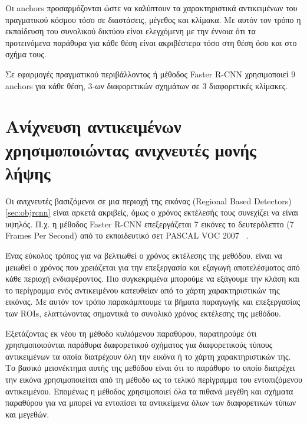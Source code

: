 Οι anchors προσαρμόζονται ώστε να καλύπτουν τα χαρακτηριστικά αντικειμένων του
πραγματικού κόσμου τόσο σε διαστάσεις, μέγεθος και κλίμακα. Με αυτόν τον τρόπο
η εκπαίδευση του συνολικού δικτύου είναι ελεγχόμενη με την έννοια ότι τα προτεινόμενα
παράθυρα για κάθε θέση είναι ακριβέστερα τόσο στη θέση όσο και στο σχήμα τους.

Σε εφαρμογές πραγματικού περιβάλλοντος ή μέθοδος Faster R-CNN χρησιμοποιεί 9
anchors για κάθε θέση, 3-ων διαφορετικών σχημάτων σε 3 διαφορετικές κλίμακες.

\section{Ανίχνευση αντικειμένων χρησιμοποιώντας ανιχνευτές μονής λήψης}\label{sec:objssd}

Οι ανιχνευτές βασιζόμενοι σε μια περιοχή της εικόνας (Regional Based Detectors)
\ref{sec:objrcnn} είναι αρκετά ακριβείς, όμως ο χρόνος εκτέλεσής τους συνεχίζει
να είναι υψηλός. Π.χ. η μέθοδος Faster R-CNN επεξεργάζεται 7 εικόνες το δευτερόλεπτο
(7 Frames Per Second) από το εκπαιδευτικό σετ PASCAL VOC 2007~\cite{pascal-voc-2007} .

\begin{listing}
\end{listing}

Ένας εύκολος τρόπος για να βελτιωθεί ο χρόνος εκτέλεσης της μεθόδου, είναι να
μειωθεί ο χρόνος που χρειάζεται για την επεξεργασία και εξαγωγή αποτελέσματος από
κάθε περιοχή ενδιαφέροντος. Πιο συγκεκριμένα μπορούμε να εξάγουμε την κλάση και το
περίγραμμα ενός αντικειμένου κατευθείαν από το χάρτη χαρακτηριστικών της εικόνας.
Με αυτόν τον τρόπο παρακάμπτουμε τα βήματα παραγωγής και επεξεργασίας των ROIs,
ελαττώνοντας σημαντικά το συνολικό χρόνος εκτέλεσης της μεθόδου.

\begin{listing}
\end{listing}

Εξετάζοντας εκ νέου τη μέθοδο κυλιόμενου παραθύρου, παρατηρούμε ότι χρησιμοποιούνται
παράθυρα διαφορετικού σχήματος για διαφορετικούς τύπους αντικειμένων τα οποία
διατρέχουν όλη την εικόνα ή το χάρτη χαρακτηριστικών της. Το βασικό μειονέκτημα
αυτής της μεθόδου είναι ότι το παράθυρο το οποίο διατρέχει την εικόνα χρησιμοποιείται
από τη μέθοδο ως το τελικό περίγραμμα του εντοπιζόμενου αντικειμένου. Επομένως
η μέθοδος χρησιμοποιεί όλα τα πιθανά μεγέθη και σχήματα παραθύρου για να μπορεί
να εντοπίσει τα αντικείμενα όλων των διαφορετικών τύπων και μεγεθών.
